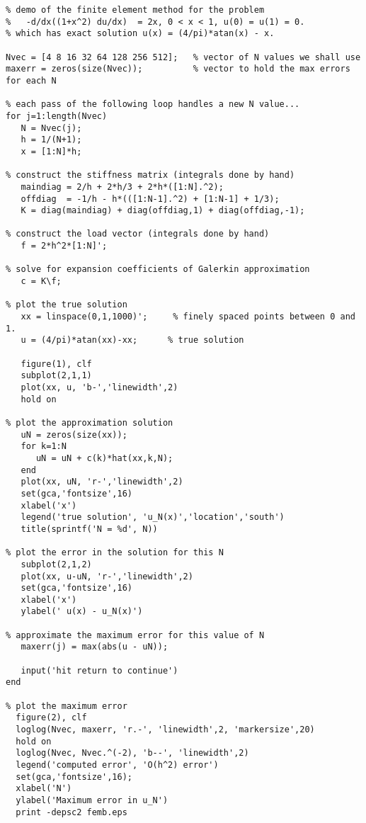 {\footnotesize \begin{verbatim}
% demo of the finite element method for the problem 
%   -d/dx((1+x^2) du/dx)  = 2x, 0 < x < 1, u(0) = u(1) = 0.
% which has exact solution u(x) = (4/pi)*atan(x) - x.

Nvec = [4 8 16 32 64 128 256 512];   % vector of N values we shall use
maxerr = zeros(size(Nvec));          % vector to hold the max errors for each N

% each pass of the following loop handles a new N value...
for j=1:length(Nvec)               
   N = Nvec(j);
   h = 1/(N+1);
   x = [1:N]*h;

% construct the stiffness matrix (integrals done by hand)
   maindiag = 2/h + 2*h/3 + 2*h*([1:N].^2);
   offdiag  = -1/h - h*(([1:N-1].^2) + [1:N-1] + 1/3);
   K = diag(maindiag) + diag(offdiag,1) + diag(offdiag,-1);

% construct the load vector (integrals done by hand)
   f = 2*h^2*[1:N]';

% solve for expansion coefficients of Galerkin approximation
   c = K\f;

% plot the true solution
   xx = linspace(0,1,1000)';     % finely spaced points between 0 and 1.
   u = (4/pi)*atan(xx)-xx;      % true solution

   figure(1), clf
   subplot(2,1,1)
   plot(xx, u, 'b-','linewidth',2)
   hold on

% plot the approximation solution
   uN = zeros(size(xx));
   for k=1:N
      uN = uN + c(k)*hat(xx,k,N);
   end 
   plot(xx, uN, 'r-','linewidth',2)
   set(gca,'fontsize',16)
   xlabel('x')
   legend('true solution', 'u_N(x)','location','south')
   title(sprintf('N = %d', N))
  
% plot the error in the solution for this N 
   subplot(2,1,2)
   plot(xx, u-uN, 'r-','linewidth',2)
   set(gca,'fontsize',16)
   xlabel('x')
   ylabel(' u(x) - u_N(x)')

% approximate the maximum error for this value of N
   maxerr(j) = max(abs(u - uN));
   
   input('hit return to continue')
end

% plot the maximum error
  figure(2), clf
  loglog(Nvec, maxerr, 'r.-', 'linewidth',2, 'markersize',20)
  hold on
  loglog(Nvec, Nvec.^(-2), 'b--', 'linewidth',2)
  legend('computed error', 'O(h^2) error') 
  set(gca,'fontsize',16);
  xlabel('N')
  ylabel('Maximum error in u_N')
  print -depsc2 femb.eps 
\end{verbatim}}
